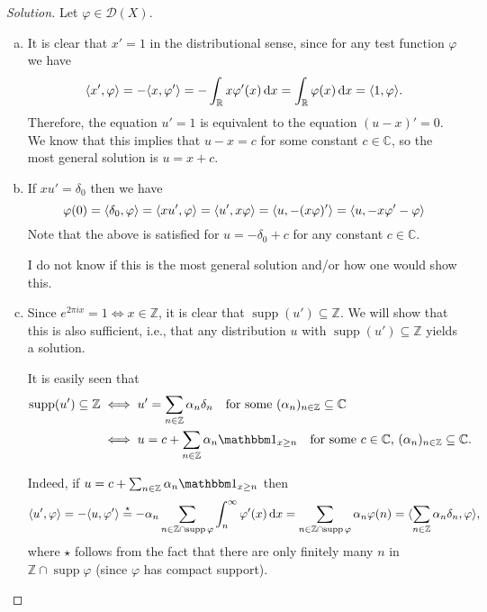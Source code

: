 \documentclass{article}
\theoremstyle{plain}
\theoremstyle{remark}
\newenvironment{solution}{\begin{proof}[Solution]\renewcommand\qedsymbol{}}{\end{proof}}
\renewcommand{\phi}{\varphi}
\newcommand{\Bb}{\mathbb}
\newcommand{\Cal}{\mathcal}
\newcommand{\CC}{\Bb C}
\newcommand{\RR}{\Bb R}
\newcommand{\DD}{\Cal D}
\newcommand\ZZ{\Bb Z}
\DeclarePairedDelimiter{\ang}{\langle}{\rangle}
\newcommand\ind{\mathbbm 1} %
\DeclareMathOperator{\supp}{supp}
\begin{document}
\begin{solution}
	Let $\phi \in \DD(X)$. 
	\begin{enumerate}[(a)]
		\item It is clear that $x' = 1$ in the distributional sense, since for any test function $\phi$ we have
		\[
		\ang{x', \phi} = -\ang{x, \phi'} = - \int_\RR x \phi'(x) \dd{x} = \int_\RR \phi(x)\dd{x} = \ang{1, \phi}. 
		\]
		Therefore, the equation $u' = 1$ is equivalent to the equation $(u - x)' = 0$. We know that this implies that $u - x = c$ for some constant $c \in \CC$, so the most general solution is $u = x + c$. 
		
		\item If $xu' = \delta_0$ then we have
		\[
		\phi(0) = \ang{\delta_0, \phi} = \ang{xu', \phi} = \ang{u', x\phi} = \ang{u, -(x\phi)'} = \ang{u, -x\phi' - \phi} %
		\]
		Note that the above is satisfied for $u = - \delta_0 + c$ for any constant $c\in \CC$.
		
		I do not know if this is the most general solution and/or how one would show this. 
		
		\item Since $e^{2\pi i x} = 1 \iff x \in \ZZ$, it is clear that $\supp(u') \subseteq \ZZ$. We will show that this is also sufficient, i.e., that any distribution $u$ with $\supp(u') \subseteq \ZZ$ yields a solution. 
		
		It is easily seen that 
		\begin{align*}
		\supp(u') \subseteq  \ZZ &\iff u' = \sum_{n \in \ZZ} \alpha_n \delta_n \quad\text{for some $(\alpha_n)_{n \in \ZZ} \subseteq \CC$} \\
		&\iff u = c + \sum_{n\in \ZZ} \alpha_n \ind_{x \geq n} \quad\text{for some $c \in \CC$, $(\alpha_n)_{n \in \ZZ} \subseteq \CC$}. 
		\end{align*}
		
		Indeed, if $u = c + \sum_{n \in \ZZ} \alpha_n \ind_{x \geq n}$ then 
		\[
		\ang{u', \phi} = -\ang{u, \phi'} \overset\star= - \alpha_n \sum_{n \in \ZZ \cap \supp\phi} \int_n^\infty \phi'(x) \dd{x} = \sum_{n \in \ZZ \cap \supp\phi} \alpha_n \phi(n) = \ang{\sum_{n \in \ZZ} \alpha_n\delta_n, \phi}, 
		\]
		where $\star$ follows from the fact that there are only finitely many $n$ in $\ZZ \cap \supp\phi$ (since $\phi$ has compact support). 
 		

\end{enumerate}
\end{solution}
\end{document}
